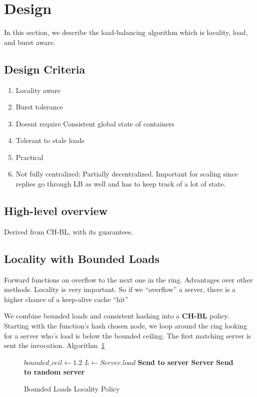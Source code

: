 \section{Design}

In this section, we describe the load-balancing algorithm which is locality, load, and burst aware.

\subsection{Design Criteria}
\begin{enumerate}
\item Locality aware 
\item Burst tolerance 
\item Doesnt require Consistent global state of containers
\item Tolerant to stale loads
\item Practical
\item Not fully centralized: Partially decentralized. Important for scaling since replies go through LB as well and has to keep track of a lot of state. 
\end{enumerate}

\subsection{High-level overview}
Derived from CH-BL, with its guarantees.


\subsection{Locality with Bounded Loads}

Forward functions on overflow to the next one in the ring.
Advantages over other methods. Locality is very important. So if we ``overflow'' a server, there is a higher chance of a keep-alive cache ``hit'' 

We combine bounded loads and consistent hashing into a \textbf{CH-BL} policy.
Starting with the function's hash chosen node, we loop around the ring looking for a server who's load is below the bounded ceiling.
The first matching server is sent the invocation. 
Algorithm~\ref{algo:BoundedLoadsPolicy}

\begin{figure}
  \begin{algorithmic}[1]
    \State $bounded\_ceil \gets 1.2$
      \State $L \gets Server.load$
        \State \textbf{Send to server Server}
      \EndIf
    \EndFor
    \State \textbf{Send to random server}
  \end{algorithmic}
  \caption{Bounded Loads Locality Policy}
\label{algo:BoundedLoadsPolicy}    
\end{figure}

